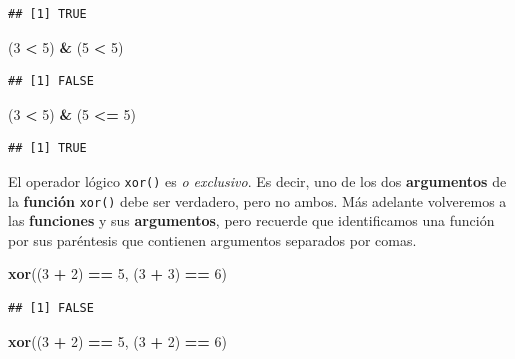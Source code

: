 \documentclass[]{book}
\newenvironment{Shaded}{\begin{snugshade}}{\end{snugshade}}
\newcommand{\KeywordTok}[1]{\textcolor[rgb]{0.13,0.29,0.53}{\textbf{#1}}}
\newcommand{\DecValTok}[1]{\textcolor[rgb]{0.00,0.00,0.81}{#1}}
\newcommand{\StringTok}[1]{\textcolor[rgb]{0.31,0.60,0.02}{#1}}
\newcommand{\OperatorTok}[1]{\textcolor[rgb]{0.81,0.36,0.00}{\textbf{#1}}}
\newcommand{\NormalTok}[1]{#1}
\begin{document}
\begin{verbatim}
## [1] TRUE
\end{verbatim}

\begin{Shaded}
\begin{Highlighting}[]
\NormalTok{(}\DecValTok{3} \OperatorTok{<}\StringTok{ }\DecValTok{5}\NormalTok{) }\OperatorTok{&}\StringTok{ }\NormalTok{(}\DecValTok{5} \OperatorTok{<}\StringTok{ }\DecValTok{5}\NormalTok{)}
\end{Highlighting}
\end{Shaded}

\begin{verbatim}
## [1] FALSE
\end{verbatim}

\begin{Shaded}
\begin{Highlighting}[]
\NormalTok{(}\DecValTok{3} \OperatorTok{<}\StringTok{ }\DecValTok{5}\NormalTok{) }\OperatorTok{&}\StringTok{ }\NormalTok{(}\DecValTok{5} \OperatorTok{<=}\StringTok{ }\DecValTok{5}\NormalTok{)}
\end{Highlighting}
\end{Shaded}

\begin{verbatim}
## [1] TRUE
\end{verbatim}

El operador lógico \texttt{xor()} es \emph{o exclusivo}. Es decir, uno
de los dos \textbf{argumentos} de la \textbf{función} \texttt{xor()}
debe ser verdadero, pero no ambos. Más adelante volveremos a las
\textbf{funciones} y sus \textbf{argumentos}, pero recuerde que
identificamos una función por sus paréntesis que contienen argumentos
separados por comas.

\begin{Shaded}
\begin{Highlighting}[]
\KeywordTok{xor}\NormalTok{((}\DecValTok{3} \OperatorTok{+}\StringTok{ }\DecValTok{2}\NormalTok{) }\OperatorTok{==}\StringTok{ }\DecValTok{5}\NormalTok{, (}\DecValTok{3} \OperatorTok{+}\StringTok{ }\DecValTok{3}\NormalTok{) }\OperatorTok{==}\StringTok{ }\DecValTok{6}\NormalTok{)}
\end{Highlighting}
\end{Shaded}

\begin{verbatim}
## [1] FALSE
\end{verbatim}

\begin{Shaded}
\begin{Highlighting}[]
\KeywordTok{xor}\NormalTok{((}\DecValTok{3} \OperatorTok{+}\StringTok{ }\DecValTok{2}\NormalTok{) }\OperatorTok{==}\StringTok{ }\DecValTok{5}\NormalTok{, (}\DecValTok{3} \OperatorTok{+}\StringTok{ }\DecValTok{2}\NormalTok{) }\OperatorTok{==}\StringTok{ }\DecValTok{6}\NormalTok{)}
\end{Highlighting}
\end{Shaded}
\end{document}
